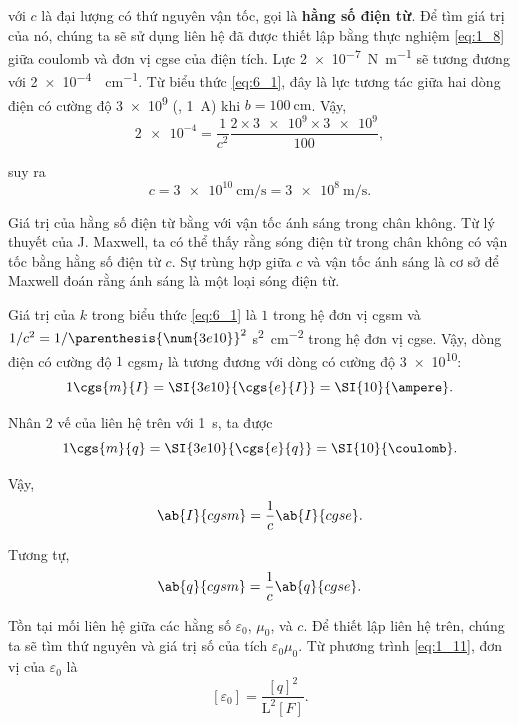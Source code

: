 \noindent
với $c$ là đại lượng có thứ nguyên vận tốc, gọi là \textbf{hằng số điện từ}. Để tìm giá trị của nó, chúng ta sẽ sử dụng liên hệ đã được thiết lập bằng thực nghiệm \eqref{eq:1_8} giữa coulomb và đơn vị cgse của điện tích. Lực \SI{2e-7}{\newton\per\metre} sẽ tương đương với \SI{2e-4}{\dyne\per\centi\metre}. Từ biểu thức \eqref{eq:6_1}, đây là lực tương tác giữa hai dòng điện có cường độ \num{3e9}  (\ie, \SI{1}{\ampere}) khi $b=\SI{100}{\centi\metre}$. Vậy,
\begin{equation*}
    \num{2e-4} = \frac{1}{c^2} \frac{2\times \num{3e9} \times \num{3e9}}{100},
\end{equation*}

\noindent
suy ra
\begin{equation}\label{eq:6_6}
    c = \SI{3e10}{\centi\metre\per\second} = \SI{3e8}{\metre\per\second}.
\end{equation}

Giá trị của hằng số điện từ bằng với vận tốc ánh sáng trong chân không. Từ lý thuyết của J. Maxwell, ta có thể thấy rằng sóng điện từ trong chân không có vận tốc bằng hằng số điện từ $c$. Sự trùng hợp giữa $c$ và vận tốc ánh sáng là cơ sở để Maxwell đoán rằng ánh sáng là một loại sóng điện từ.

Giá trị của $k$ trong biểu thức \eqref{eq:6_1} là $1$ trong hệ đơn vị cgsm và $1/c^2=1/\parenthesis{\num{3e10}}^2$ \si{\second\squared\per\centi\metre\squared} trong hệ đơn vị cgse. Vậy, dòng điện có cường độ $1$ cgsm$_I$ là tương đương với dòng có cường độ \num{3e10}:
\begin{equation}\label{eq:6_7}
    1 \cgs{m}{I} = \SI{3e10}{\cgs{e}{I}} = \SI{10}{\ampere}.
\end{equation}

\noindent
Nhân 2 vế của liên hệ trên với \SI{1}{\second}, ta được
\begin{equation}\label{eq:6_8}
    1 \cgs{m}{q} = \SI{3e10}{\cgs{e}{q}} = \SI{10}{\coulomb}.
\end{equation}

\noindent
Vậy,
\begin{equation}\label{eq:6_9}
    \ab{I}{cgsm} = \frac{1}{c} \ab{I}{cgse}.
\end{equation}

\noindent
Tương tự,
\begin{equation}\label{eq:6_10}
    \ab{q}{cgsm} = \frac{1}{c} \ab{q}{cgse}.
\end{equation}

Tồn tại mối liên hệ giữa các hằng số $\varepsilon_0$, $\mu_0$, và $c$. Để thiết lập liên hệ trên, chúng ta sẽ tìm thứ nguyên và giá trị số của tích $\varepsilon_0\mu_0$. Từ phương trình \eqref{eq:1_11}, đơn vị của $\varepsilon_0$ là
\begin{equation}\label{eq:6_11}
    [\varepsilon_0] = \frac{[q]^2}{\text{L}^2 [F]}.
\end{equation}

